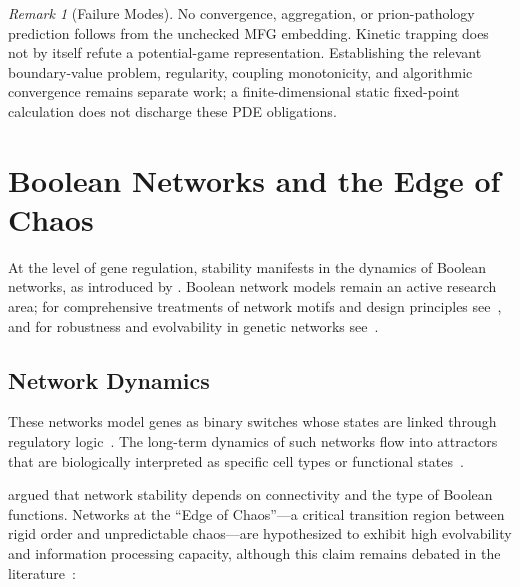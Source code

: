 \documentclass[12pt,a4paper]{article}
\theoremstyle{remark}
\newtheorem{remark}{Remark}
\begin{document}
\begin{remark}[Failure Modes]\label{rem:mfg-failure}
No convergence, aggregation, or prion-pathology prediction follows from the unchecked MFG embedding. Kinetic trapping does not by itself refute a potential-game representation. Establishing the relevant boundary-value problem, regularity, coupling monotonicity, and algorithmic convergence remains separate work; a finite-dimensional static fixed-point calculation does not discharge these PDE obligations.
\end{remark}

\section{Boolean Networks and the Edge of Chaos}
\label{sec:boolean}

At the level of gene regulation, stability manifests in the dynamics of Boolean networks, as introduced by \citet{BooleanPost,KauffmanOrigins}. Boolean network models remain an active research area; for comprehensive treatments of network motifs and design principles see~\citet{AlonSystems2007}, and for robustness and evolvability in genetic networks see~\citet{WagnerRobustness2005}.

\subsection{Network Dynamics}

These networks model genes as binary switches whose states are linked through regulatory logic~\citep{BooleanPost}. The long-term dynamics of such networks flow into attractors that are biologically interpreted as specific cell types or functional states~\citep{BooleanEvolution}.

\citet{BooleanPost} argued that network stability depends on connectivity and the type of Boolean functions. Networks at the ``Edge of Chaos''---a critical transition region between rigid order and unpredictable chaos---are hypothesized to exhibit high evolvability and information processing capacity, although this claim remains debated in the literature~\citep{KauffmanOrigins}:
\end{document}
